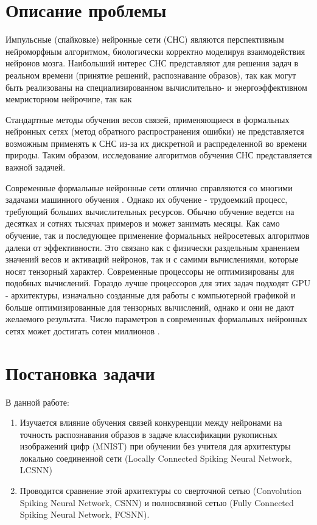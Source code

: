 \documentclass[a4paper]{article}
\begin{document}
\pagebreak

\tableofcontents

\section{Описание проблемы}
Импульсные (спайковые) нейронные сети (СНС) являются перспективным нейроморфным алгоритмом, биологически корректно моделируя взаимодействия нейронов мозга. Наибольший интерес СНС представляют для решения задач в реальном времени (принятие решений, распознавание образов), так как могут быть реализованы на специализированном вычислительно- и энергоэффективном мемристорном нейрочипе, так как 

Стандартные методы обучения весов связей, применяющиеся в формальных нейронных сетях (метод обратного распространения ошибки) не представляется возможным применять к СНС из-за их дискретной и распределенной во времени природы. Таким образом, исследование алгоритмов обучения СНС представляется важной задачей.

Современные формальные нейронные сети отлично справляются со многими задачами машинного обучения \cite{pmlr-v28-wan13}. Однако их обучение - трудоемкий процесс, требующий больших вычислительных ресурсов. Обычно обучение ведется на десятках и сотнях тысячах примеров и может занимать месяцы. Как само обучение, так и последующее применение формальных нейросетевых алгоритмов далеки от эффективности. Это связано как с физически раздельным хранением значений весов и активаций нейронов, так и с самими вычислениями, которые носят тензорный характер. Современные процессоры не оптимизированы для подобных вычислений. Гораздо лучше процессоров для этих задач подходят GPU - архитектуры, изначально созданные для работы с компьютерной графикой и больше оптимизированные для тензорных вычислений, однако и они не дают желаемого результата. Число параметров в современных формальных нейронных сетях может достигать сотен миллионов \cite{ManyParams}.

\section{Постановка задачи}
В данной работе:

\begin{enumerate}
 \item Изучается влияние обучения связей конкуренции \cite{MaxActiv1} \cite{MaxActiv2} между нейронами на точность распознавания образов в задаче классификации рукописных изображений цифр (MNIST) при обучении без учителя для архитектуры локально соединенной сети (Locally Connected Spiking Neural Network, LCSNN) \cite{saunders2019locally}
 
 \item Проводится сравнение этой архитектуры со сверточной сетью (Convolution Spiking Neural Network, CSNN) и полносвязной сетью (Fully Connected Spiking Neural Network, FCSNN).

\end{enumerate}
\end{document}
